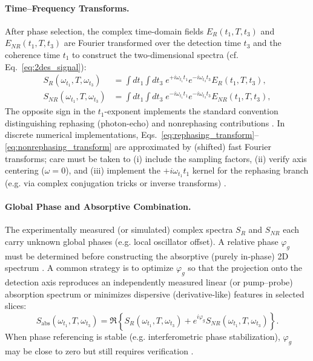 \paragraph{Time--Frequency Transforms.}
\noindent After phase selection, the complex time-domain fields $E_{R}(t_1, T, t_3)$ and $E_{NR}(t_1, T, t_3)$ are Fourier transformed over the detection time $t_3$ and the coherence time $t_1$ to construct the two-dimensional spectra (cf. Eq.~\eqref{eq:2des_signal}):
\begin{align}
	S_{R}(\omega_{t_1}, T, \omega_{t_3})
	 & =
	\int dt_1 \int dt_3 \;
	e^{+ i \omega_{t_1} t_1} e^{- i \omega_{t_3} t_3}
	E_{R}(t_1, T, t_3),
	\label{eq:rephasing_transform} \\
	S_{NR}(\omega_{t_1}, T, \omega_{t_3})
	 & =
	\int dt_1 \int dt_3 \;
	e^{- i \omega_{t_1} t_1} e^{- i \omega_{t_3} t_3}
	E_{NR}(t_1, T, t_3),
	\label{eq:nonrephasing_transform}
\end{align}
The opposite sign in the $t_1$-exponent implements the standard convention distinguishing rephasing (photon-echo) and nonrephasing contributions \cite{cho2009twodimensionalopticalspectroscopy, greenetal2024vibrationalcoherenceshalfbroadband}. In discrete numerical implementations, Eqs.~\eqref{eq:rephasing_transform}--\eqref{eq:nonrephasing_transform} are approximated by (shifted) fast Fourier transforms; care must be taken to (i) include the sampling factors, (ii) verify axis centering ($\omega=0$), and (iii) implement the $+i\omega_{t_1} t_1$ kernel for the rephasing branch (e.g. via complex conjugation tricks or inverse transforms) \cite{cho2009twodimensionalopticalspectroscopy, greenetal2024vibrationalcoherenceshalfbroadband}.

\paragraph{Global Phase and Absorptive Combination.}
\noindent The experimentally measured (or simulated) complex spectra $S_{R}$ and $S_{NR}$ each carry unknown global phases (e.g. local oscillator offset). A relative phase $\varphi_g$ must be determined before constructing the absorptive (purely in-phase) 2D spectrum \cite{mukamel1995principlesnonlinearoptical, jonas2003twodimensionalfemtosecondspectroscopy, greenetal2024vibrationalcoherenceshalfbroadband}. A common strategy is to optimize $\varphi_g$ so that the projection onto the detection axis reproduces an independently measured linear (or pump--probe) absorption spectrum or minimizes dispersive (derivative-like) features in selected slices:
\begin{equation}
	S_{\text{abs}}(\omega_{t_1}, T, \omega_{t_3})
	=
	\Re \left\{
	S_{R}(\omega_{t_1}, T, \omega_{t_3}) + e^{i \varphi_g} S_{NR}(\omega_{t_1}, T, \omega_{t_3})
	\right\}.
	\label{eq:absorptive_spectrum}
\end{equation}
When phase referencing is stable (e.g. interferometric phase stabilization), $\varphi_g$ may be close to zero but still requires verification \cite{brixneretal2004phasestabilizedtwodimensionalelectronic, greenetal2024vibrationalcoherenceshalfbroadband}.

